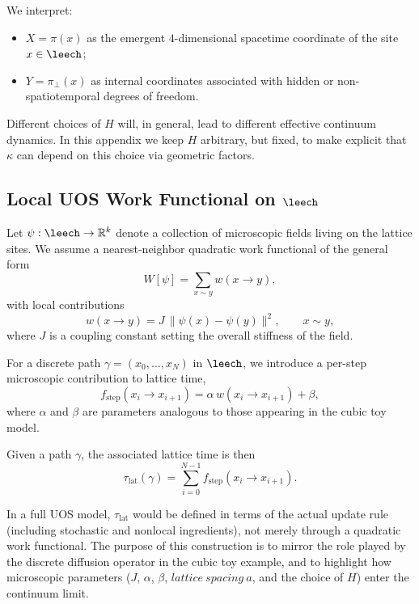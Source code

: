 We interpret:
\begin{itemize}
  \item $X = \pi(x)$ as the emergent $4$-dimensional spacetime coordinate of
the site $x \in \leech$;
  \item $Y = \pi_\perp(x)$ as internal coordinates associated with hidden or
        non-spatiotemporal degrees of freedom.
\end{itemize}

Different choices of $H$ will, in general, lead to different effective
continuum dynamics. In this appendix we keep $H$ arbitrary, but fixed, to make
explicit that $\kappa$ can depend on this choice via geometric factors.

\subsection{Local UOS Work Functional on $\leech$}
\label{subsec:kappa-leech-work}

Let $\psi: \leech \to \mathbb{R}^k$ denote a collection of microscopic fields
living on the lattice sites. We assume a nearest-neighbor quadratic work
functional of the general form
\begin{equation}
  W[\psi] = \sum_{x \sim y} w(x \to y),
\end{equation}
with local contributions
\begin{equation}
  w(x \to y) = J\,\big\|\psi(x) - \psi(y)\big\|^2,
  \qquad x \sim y,
\end{equation}
where $J$ is a coupling constant setting the overall stiffness of the field.

For a discrete path $\gamma = (x_0,\dots,x_N)$ in $\leech$, we introduce a
per-step microscopic contribution to lattice time,
\begin{equation}
  f_{\text{step}}(x_i \to x_{i+1}) = \alpha\, w(x_i \to x_{i+1}) + \beta,
\end{equation}
where $\alpha$ and $\beta$ are parameters analogous to those appearing in the
cubic toy model.

Given a path $\gamma$, the associated lattice time is then
\begin{equation}
  \tau_{\mathrm{lat}}(\gamma) =
  \sum_{i=0}^{N-1} f_{\text{step}}(x_i \to x_{i+1}).
\end{equation}

In a full UOS model, $\tau_{\mathrm{lat}}$ would be defined in terms of the
actual update rule (including stochastic and nonlocal ingredients), not merely
through a quadratic work functional. The purpose of this construction is to
mirror the role played by the discrete diffusion operator in the cubic toy
example, and to highlight how microscopic parameters ($J$, $\alpha$, $\beta$,
$lattice\ spacing\ a$, and the choice of $H$) enter the continuum limit.

